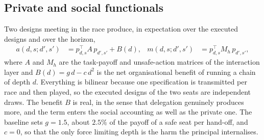 \documentclass[a4paper,fleqn]{cas-sc}
\begin{document}
\subsection{Private and social functionals}
\label{sec:functionals}

Two designs meeting in the race produce, in expectation over the executed
designs and over the horizon,
\begin{align}
  a(d,s;d',s') &= p_{d,s}^{\top} A\, p_{d',s'} + B(d), &
  m(d,s;d',s') &= p_{d,s}^{\top} M_{h}\, p_{d',s'},
  \label{eq:bilinear}
\end{align}
where $A$ and $M_{h}$ are the task-payoff and unsafe-action matrices of the
interaction layer and $B(d)=g\,d-c\,d^{2}$ is the net organisational benefit of
running a chain of depth $d$. Everything is bilinear because one specification
is transmitted per race and then played, so the executed designs of the two
seats are independent draws. The benefit $B$ is real, in the sense that
delegation genuinely produces more, and the term enters the social accounting
as well as the private one. The baseline sets $g=1.5$, about $2.5\%$ of the
payoff of a safe seat per hand-off, and $c=0$, so that the only force limiting
depth is the harm the principal internalises.
\end{document}
